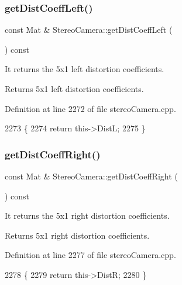 \subsubsection{\texorpdfstring{get\+Dist\+Coeff\+Left()}{getDistCoeffLeft()}}
{\footnotesize\ttfamily const Mat \& Stereo\+Camera\+::get\+Dist\+Coeff\+Left (\begin{DoxyParamCaption}{ }\end{DoxyParamCaption}) const}



It returns the 5x1 left distortion coefficients. 

\begin{DoxyReturn}{Returns}
5x1 left distortion coefficients. 
\end{DoxyReturn}


Definition at line 2272 of file stereo\+Camera.\+cpp.


\begin{DoxyCode}
2273 \{
2274     \textcolor{keywordflow}{return} this->DistL;
2275 \}
\end{DoxyCode}
\mbox{\label{classStereoCamera_a589ca8eb4ebfc4377589a77bb15b85b7}} 
\subsubsection{\texorpdfstring{get\+Dist\+Coeff\+Right()}{getDistCoeffRight()}}
{\footnotesize\ttfamily const Mat \& Stereo\+Camera\+::get\+Dist\+Coeff\+Right (\begin{DoxyParamCaption}{ }\end{DoxyParamCaption}) const}



It returns the 5x1 right distortion coefficients. 

\begin{DoxyReturn}{Returns}
5x1 right distortion coefficients. 
\end{DoxyReturn}


Definition at line 2277 of file stereo\+Camera.\+cpp.


\begin{DoxyCode}
2278 \{
2279     \textcolor{keywordflow}{return} this->DistR;
2280 \}
\end{DoxyCode}
\mbox{\label{classStereoCamera_af64550bb8a7a665930dee5eea87b7e47}} 
